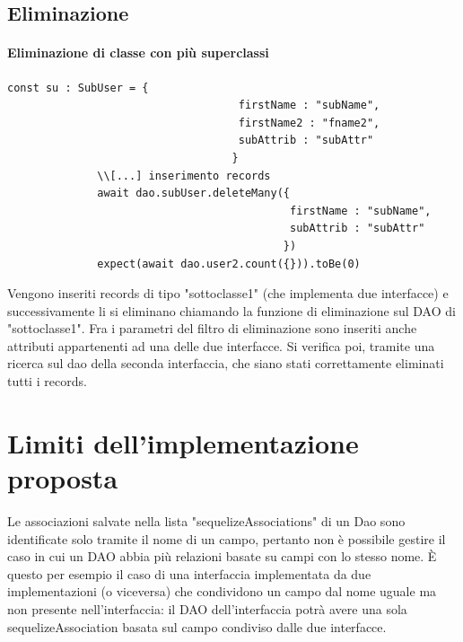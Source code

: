 \documentclass[a4paper, 12pt]{report}
\begin{document}
        \subsection{Eliminazione}
          \paragraph{Eliminazione di classe con più superclassi}
            \begin{Verbatim}[samepage=true]
              const su : SubUser = {
                                    firstName : "subName",
                                    firstName2 : "fname2",
                                    subAttrib : "subAttr"
                                   }
              \\[...] inserimento records
              await dao.subUser.deleteMany({
                                            firstName : "subName",
                                            subAttrib : "subAttr"
                                           })
              expect(await dao.user2.count({})).toBe(0)
            \end{Verbatim}
            Vengono inseriti records di tipo "sottoclasse1" (che implementa due interfacce) e successivamente li si eliminano chiamando la funzione di eliminazione sul DAO di "sottoclasse1".
            Fra i parametri del filtro di eliminazione sono inseriti anche attributi appartenenti ad una delle due interfacce.
            Si verifica poi, tramite una ricerca sul dao della seconda interfaccia, che siano stati correttamente eliminati tutti i records.
      \section{Limiti dell'implementazione proposta}
        Le associazioni salvate nella lista "sequelizeAssociations" di un Dao sono identificate solo tramite il nome di un campo, pertanto non è possibile gestire il caso in cui un DAO abbia più relazioni basate su campi con lo stesso nome.
        È questo per esempio il caso di una interfaccia implementata da due implementazioni (o viceversa) che condividono un campo dal nome uguale ma non presente nell'interfaccia: il DAO dell'interfaccia potrà avere una sola sequelizeAssociation basata sul campo condiviso dalle due interfacce.
\end{document}
